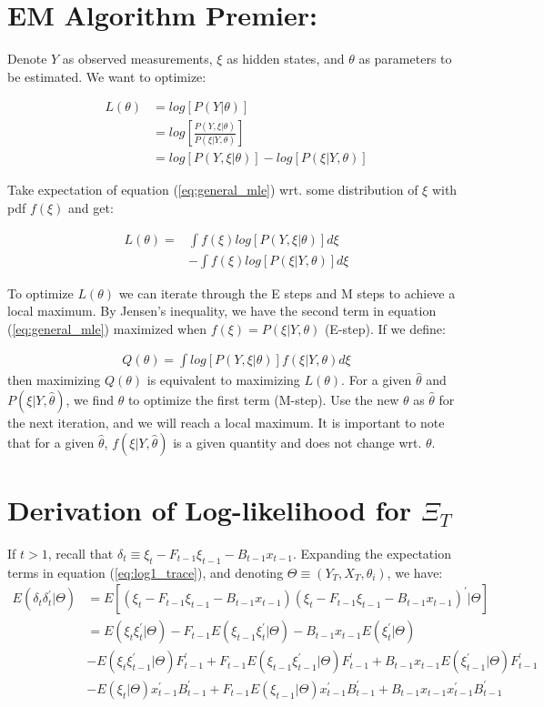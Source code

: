 \documentclass[12pt]{article}
\numberwithin{equation}{section}
\begin{document}
\section{EM Algorithm Premier:} \label{ap:EM_proof}
Denote $Y$ as observed measurements, $\xi$ as hidden states, and $\theta$ as parameters to be estimated. We want to optimize:

\begin{align}
    L(\theta) & = log[P(Y|\theta)] \nonumber \\
    & = log\left[\frac{P(Y,\xi|\theta)}{P(\xi|Y,\theta)}\right] \nonumber \\
    & = log[P(Y,\xi|\theta)] - log[P(\xi|Y,\theta)] \label{eq:general_mle}
\end{align}

Take expectation of equation (\ref{eq:general_mle}) wrt. some distribution of $\xi$ with pdf $f(\xi)$ and get:

\begin{align}
    L(\theta) = & \int f(\xi)log[P(Y,\xi|\theta)]d\xi \nonumber \\
    & - \int f(\xi)log[P(\xi|Y,\theta)]d\xi \nonumber
\end{align}

To optimize $L(\theta)$ we can iterate through the E steps and M steps to achieve a local maximum. By Jensen's inequality, we have the second term in equation (\ref{eq:general_mle}) maximized when $f(\xi)=P(\xi|Y,\theta)$ (E-step). If we define:

\begin{align}
    Q(\theta) = \int log[P(Y,\xi|\theta)]f(\xi|Y,\theta)d\xi \label{eq:Q}
\end{align}
then maximizing $Q(\theta)$ is equivalent to maximizing $ L(\theta)$. For a given $\hat{\theta}$ and $P(\xi|Y, \hat{\theta})$, we find $\theta$ to optimize the first term (M-step). Use the new $\theta$ as $\hat{\theta}$ for the next iteration, and we will reach a local maximum. It is important to note that for a given $\hat{\theta}$, $f(\xi|Y, \hat{\theta})$ is a given quantity and does not change wrt. $\theta$. 
\section{Derivation of Log-likelihood for $\Xi_T$} \label{ap:log}
If $t>1$, recall that $\delta_t \equiv \xi_t - F_{t-1}\xi_{t-1} - B_{t-1}x_{t-1}$. Expanding the expectation terms in equation (\ref{eq:log1_trace}), and denoting $\Theta \equiv (Y_T,X_T, \theta_i)$, we have:
\begin{align*}
    E(\delta_t\delta_t^{'}|\Theta) &= E[(\xi_t-F_{t-1}\xi_{t-1}-B_{t-1}x_{t-1}) 
    (\xi_t-F_{t-1}\xi_{t-1}-B_{t-1}x_{t-1})^{'}|\Theta] \\
    &= E(\xi_t\xi_t^{'}|\Theta) - F_{t-1}E(\xi_{t-1}\xi_{t}^{'}|\Theta) - B_{t-1}x_{t-1}E(\xi_t^{'}|\Theta) \\
    &- E(\xi_t\xi_{t-1}^{'}|\Theta)F_{t-1}^{'} + F_{t-1}E(\xi_{t-1}\xi_{t-1}^{'}|\Theta)F_{t-1}^{'}
    +B_{t-1}x_{t-1}E(\xi_{t-1}^{'}|\Theta)F_{t-1}^{'} \\
    &- E(\xi_t|\Theta)x_{t-1}^{'}B_{t-1}^{'} + F_{t-1}E(\xi_{t-1}|\Theta)x_{t-1}^{'}B_{t-1}^{'}
    +B_{t-1}x_{t-1}x_{t-1}^{'}B_{t-1}^{'}
\end{align*}
\end{document}
